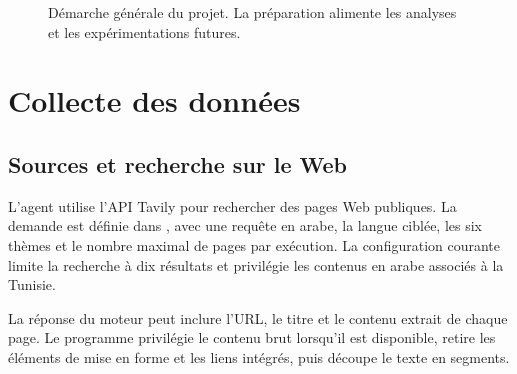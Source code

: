 \documentclass[11pt,a4paper]{article}
\DeclareRobustCommand{\file}[1]{{\small\urlstyle{tt}\path{#1}}}
\begin{document}
\begin{figure}[!ht]
\centering
{}
\caption{Démarche générale du projet. La préparation alimente les analyses et les expérimentations futures.}
\end{figure}

\section{Collecte des données}
\subsection{Sources et recherche sur le Web}
L'agent utilise l'API Tavily pour rechercher des pages Web publiques. La demande est définie dans \file{AI_agent/prompt.txt}, avec une requête en arabe, la langue ciblée, les six thèmes et le nombre maximal de pages par exécution. La configuration courante limite la recherche à dix résultats et privilégie les contenus en arabe associés à la Tunisie.

La réponse du moteur peut inclure l'URL, le titre et le contenu extrait de chaque page. Le programme privilégie le contenu brut lorsqu'il est disponible, retire les éléments de mise en forme et les liens intégrés, puis découpe le texte en segments.
\end{document}
